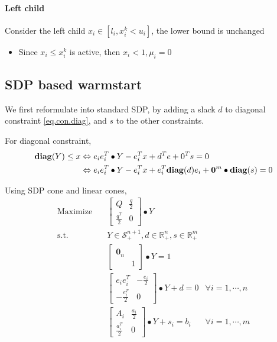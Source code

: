 \documentclass[../main]{subfiles}
\begin{document}
\paragraph{Left child}
Consider the left child \(x_i \in [l_i, x_i^k < u_i]\), the lower bound is unchanged
\begin{itemize}
    \item Since \(x_i \le x_i^k\) is active, then \(x_i < 1, \mu_i = 0\)
\end{itemize}

\subsection{SDP based warmstart}

We first reformulate into standard SDP, by adding a slack \(d\) to diagonal constraint \eqref{eq.con.diag}, and \(s\) to the other constraints.


For diagonal constraint,
\begin{align*}
    \mathbf{diag}(Y) \le x & \Leftrightarrow e_ie_i^T \bullet Y - e_i^T x + d^Te + 0^Ts = 0                                 \\
                   & \Leftrightarrow e_ie_i^T \bullet Y - e_i^T x + e_i^T\mathbf{diag}(d)e_i + \bm 0^m \bullet \mathbf{diag}(s) = 0
\end{align*}

Using SDP cone and linear cones,
\begin{equation}
    \begin{aligned}
        \mathrm{Maximize}\quad & \begin{bmatrix}
            Q & \frac{q}{2} \\ \frac{q^T}{2} & 0
        \end{bmatrix} \bullet Y                                       \\
        \mathrm{s.t.} \quad    & Y  \in \mathscr S^{n+1}_+, d \in \mathbb{R}^n_+, s
        \in \mathbb{R}^m_+                                                                                  \\
                               & \begin{bmatrix}  \bm 0_n &  \\  & 1  \end{bmatrix} \bullet Y = 1                                   \\
                               & \begin{bmatrix} e_ie_i^T         & -\frac{e_i}{2} \\ -\frac{e_i^T}{2} & 0 \end{bmatrix} \bullet Y + d= 0        & \forall i=1,\cdots, n \\
                               & \begin{bmatrix} A_i             & \frac{a_i}{2} \\ \frac{a_i^T}{2} & 0 \end{bmatrix}\bullet Y + s_i = b_i    & \forall i=1,\cdots, m \\
    \end{aligned}
\end{equation}
\end{document}
